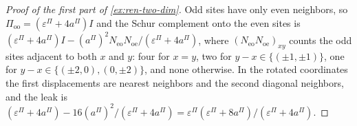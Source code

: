 \begin{proof}[Proof of the first part of \cref{ex:ren-two-dim}]
Odd sites have only even neighbors, so $\Pi_{\mathrm{oo}}=(\varepsilon^\Pi+4a^\Pi)I$ and the Schur complement onto the even sites is $(\varepsilon^\Pi+4a^\Pi)I-(a^\Pi)^2N_{\mathrm{eo}}N_{\mathrm{oe}}/(\varepsilon^\Pi+4a^\Pi)$, where $(N_{\mathrm{eo}}N_{\mathrm{oe}})_{xy}$ counts the odd sites adjacent to both $x$ and $y$: four for $x=y$, two for $y-x\in\{(\pm1,\pm1)\}$, one for $y-x\in\{(\pm2,0),(0,\pm2)\}$, and none otherwise. In the rotated coordinates the first displacements are nearest neighbors and the second diagonal neighbors, and the leak is $(\varepsilon^\Pi+4a^\Pi)-16(a^\Pi)^2/(\varepsilon^\Pi+4a^\Pi)=\varepsilon^\Pi(\varepsilon^\Pi+8a^\Pi)/(\varepsilon^\Pi+4a^\Pi)$.
\end{proof}

